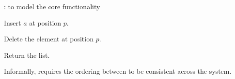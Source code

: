 \begin{frame}{}
  \centerline{\Large {}: to model the core functionality}
  \vspace{0.30cm}

  \begin{center}
    \begin{minipage}{0.70\textwidth}
      \begin{description}
	\setlength{\itemsep}{10pt}
	\item[$\textsc{Ins}(a, p):$] Insert $a$ at position $p$.
	\item[$\textsc{Del}(p):$] Delete the element at position $p$.
	\item[$\textsc{Read}:$] Return the list.
      \end{description}
    \end{minipage}
  \end{center}
\end{frame}

\begin{frame}{}

  \vspace{0.20cm}
  \begin{definition}
    Informally, \wlspec{} requires the ordering between  to be consistent across the system.
  \end{definition}

  \vspace{0.60cm}
  \centerline{}
\end{frame}

